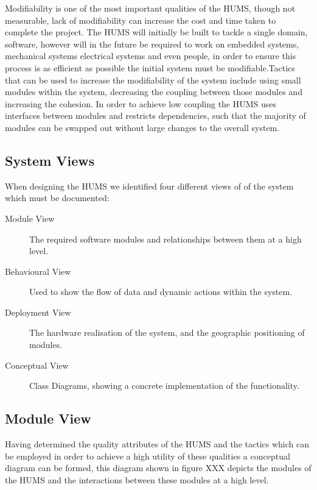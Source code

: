 \documentclass[10pt,a4paper]{article}
\begin{document}
Modifiability is one of the most important qualities of the HUMS, though not measurable, 
lack of modifiability can increase the cost and time taken to complete the project. The 
HUMS will initially be built to tackle a single domain, software, however will in the future 
be required to work on embedded systems, mechanical systems electrical systems and 
even people, in order to ensure this process is as efficient as possible the initial system 
must be modifiable.Tactics that can be used to increase the modifiability of the system include using small modules within the system, decreasing the coupling between those modules and increasing the cohesion. In order to achieve low coupling  the HUMS uses interfaces between modules and restricts dependencies, such that the majority of modules can be swapped out without large changes to the overall system.

\subsection{System Views}
When designing the HUMS we identified four different views of of the system which must be documented:
\begin{description}
\item[Module View] The required software modules and relationships between them at a high level.
\item[Behavioural View] Used to show the flow of data and dynamic actions within the system.
\item[Deployment View] The hardware realisation of the system, and the geographic positioning of modules.
\item[Conceptual View] Class Diagrams, showing a concrete implementation of the functionality.
\end{description}

\subsection{Module View}
Having determined the quality attributes of the HUMS and the tactics which can be employed in order to achieve a high utility of these qualities a conceptual diagram can be formed, this diagram shown in figure XXX depicts the modules of the HUMS and the interactions between these modules at a high level.

\end{document}
